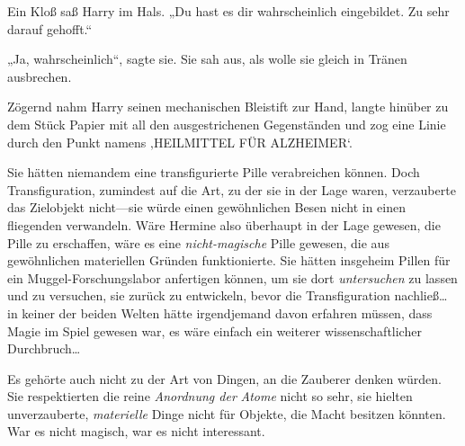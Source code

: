 Ein Kloß saß Harry im Hals. „Du hast es dir wahrscheinlich eingebildet. Zu sehr darauf gehofft.“

„Ja, wahrscheinlich“, sagte sie. Sie sah aus, als wolle sie gleich in Tränen ausbrechen.

Zögernd nahm Harry seinen mechanischen Bleistift zur Hand, langte hinüber zu dem Stück Papier mit all den ausgestrichenen Gegenständen und zog eine Linie durch den Punkt namens ‚HEILMITTEL FÜR ALZHEIMER‘.

Sie hätten niemandem eine transfigurierte Pille verabreichen können. Doch Transfiguration, zumindest auf die Art, zu der sie in der Lage waren, verzauberte das Zielobjekt nicht—sie würde einen gewöhnlichen Besen nicht in einen fliegenden verwandeln. Wäre Hermine also überhaupt in der Lage gewesen, die Pille zu erschaffen, wäre es eine \emph{nicht-magische} Pille gewesen, die aus gewöhnlichen materiellen Gründen funktionierte. Sie hätten insgeheim Pillen für ein Muggel-Forschungslabor anfertigen können, um sie dort \emph{untersuchen} zu lassen und zu versuchen, sie zurück zu entwickeln, bevor die Transfiguration nachließ… in keiner der beiden Welten hätte irgendjemand davon erfahren müssen, dass Magie im Spiel gewesen war, es wäre einfach ein weiterer wissenschaftlicher Durchbruch…

Es gehörte auch nicht zu der Art von Dingen, an die Zauberer denken würden. Sie respektierten die reine \emph{Anordnung der} \emph{Atome} nicht so sehr, sie hielten unverzauberte, \emph{materielle} Dinge nicht für Objekte, die Macht besitzen könnten. War es nicht magisch, war es nicht interessant.


